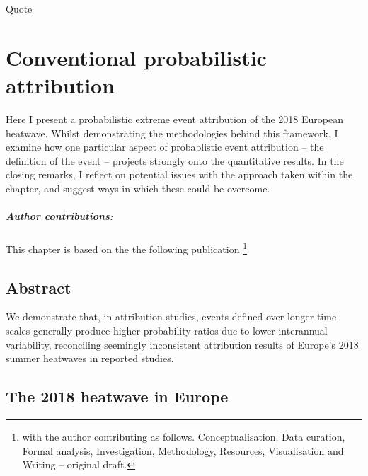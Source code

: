 \begin{savequote}[8cm]
    Quote
\end{savequote}
    
\chapter{\label{ch1}Conventional probabilistic attribution} 

Here I present a probabilistic extreme event attribution of the 2018 European heatwave. Whilst demonstrating the methodologies behind this framework, I examine how one particular aspect of probablistic event attribution -- the definition of the event -- projects strongly onto the quantitative results. In the closing remarks, I reflect on potential issues with the approach taken within the chapter, and suggest ways in which these could be overcome.
\small\paragraph{Author contributions:} This chapter is based on the the following publication \footnote{with the author contributing as follows. Conceptualisation, Data curation, Formal analysis, Investigation, Methodology, Resources, Visualisation and Writing -- original draft.} \par\vspace{1em}


\minitoc

\clearpage

\section{Abstract}

  We demonstrate that, in attribution studies, events defined over longer time scales generally produce higher probability ratios due to lower interannual variability, reconciling seemingly inconsistent attribution results of Europe's 2018 summer heatwaves in reported studies.

\section{The 2018 heatwave in Europe}

